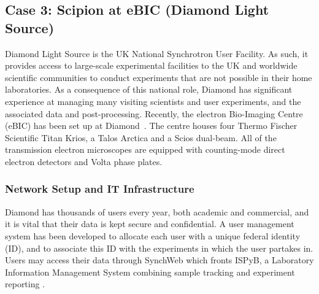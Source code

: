 
\subsection{Case 3: Scipion at eBIC (Diamond Light Source)}

Diamond Light Source is the UK National Synchrotron User Facility.  As such, it provides access to large-scale experimental facilities to the UK and worldwide scientific communities to conduct experiments that are not possible in their home laboratories.  As a consequence of this national role, Diamond has significant experience at managing many visiting scientists and user experiments, and the associated data and post-processing.  %
Recently, the electron Bio-Imaging Centre (eBIC) has been set up at Diamond~\citep{diamond2017}. The centre houses four Thermo Fischer Scientific Titan Krios, a Talos Arctica and a Scios dual-beam. All of the transmission electron microscopes are equipped with counting-mode direct electron detectors and Volta phase plates. 

\subsubsection{Network Setup and IT Infrastructure}

Diamond has thousands of users every year, both academic and commercial, and it is vital that their data is kept secure and confidential. A user management system
has been developed to allocate each user with a unique federal identity (ID),
and to associate this ID with the experiments in which the user partakes in.
 Users may access their data through SynchWeb which fronts ISPyB, a Laboratory Information Management System combining sample tracking and experiment reporting \citep{Delageniere2011:ispb, Fisher2015:synchweb}.
 
